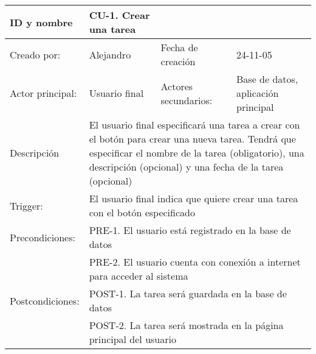 \begin{center}
\begin{tabular}{p{3cm}p{5cm}p{4cm}p{2cm}}
  \hline
  ID y nombre & CU-1. Crear una tarea & & \\
  \hline
  Creado por: & Alejandro & Fecha de creaci\'on & 24-11-05\\
  \hline
  Actor principal: & Usuario final & Actores secundarios: & Base de datos, aplicaci\'on principal\\
  \hline
  Descripci\'on & \multicolumn{3}{p{11cm}}{El usuario final especificar\'a una tarea a crear con el bot\'on para crear una nueva tarea. Tendr\'a que especificar el nombre de la tarea (obligatorio), una descripci\'on (opcional) y una fecha de la tarea (opcional)}\\
  \hline
  Trigger: & \multicolumn{3}{p{11cm}}{El usuario final indica que quiere crear una tarea con el bot\'on especificado}\\
  \hline
  Precondiciones: & \multicolumn{3}{p{11cm}}{PRE-1. El usuario est\'a registrado en la base de datos}\\
		  & \multicolumn{3}{p{11cm}}{PRE-2. El usuario cuenta con conexi\'on a internet para acceder al sistema}\\
  \hline
  Postcondiciones: & \multicolumn{3}{p{11cm}}{POST-1. La tarea ser\'a guardada en la base de datos}\\
		   & \multicolumn{3}{p{11cm}}{POST-2. La tarea ser\'a mostrada en la p\'agina principal del usuario}\\
  \hline
\end{tabular}
\end{center}

